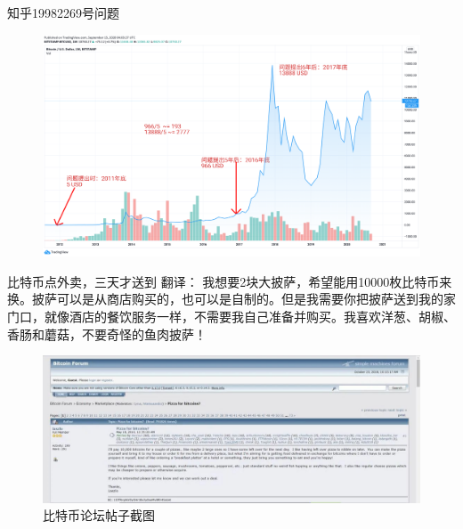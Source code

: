\documentclass[11pt]{beamer}
\begin{document}
\begin{frame}{知乎19982269号问题}
	\begin{figure}
		\centering
		\includegraphics[width=\linewidth]{figures/btc6000}
	\end{figure}
\end{frame}

\begin{frame}{比特币点外卖，三天才送到}
	翻译： 我想要2块大披萨，希望能用10000枚比特币来换。披萨可以是从商店购买的，也可以是自制的。但是我需要你把披萨送到我的家门口，就像酒店的餐饮服务一样，不需要我自己准备并购买。我喜欢洋葱、胡椒、香肠和蘑菇，不要奇怪的鱼肉披萨！
	\begin{figure}
		\centering
		\includegraphics[width=0.7\linewidth]{figures/pizzabbs}
		\caption{比特币论坛帖子截图}
		\label{fig:pizzabbs}
	\end{figure}
\end{frame}
\end{document}
